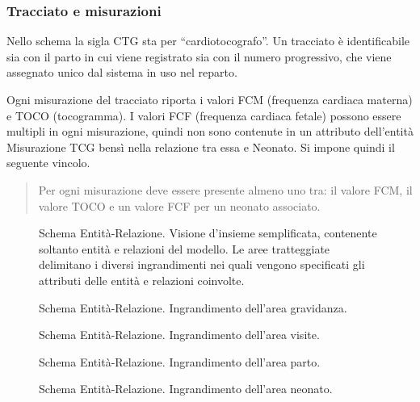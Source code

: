 \subsubsection{Tracciato e misurazioni}

Nello schema la sigla CTG sta per \enquote{cardiotocografo}.
Un tracciato è identificabile sia con il parto in cui viene registrato sia con il numero progressivo, che viene assegnato unico dal sistema in uso nel reparto.

Ogni misurazione del tracciato riporta i valori FCM (frequenza cardiaca materna) e TOCO (tocogramma).
I valori FCF (frequenza cardiaca fetale) possono essere multipli in ogni misurazione, quindi non sono contenute in un attributo dell'entità Misurazione TCG bensì nella relazione tra essa e Neonato.
Si impone quindi il seguente vincolo.
\begin{quote}
Per ogni misurazione deve essere presente almeno uno tra: il valore FCM, il valore TOCO e un valore FCF per un neonato associato.
\end{quote}

\begin{figure}
    \centering
    
    \caption{Schema Entità-Relazione. Visione d'insieme semplificata, contenente soltanto entità e relazioni del modello. Le aree tratteggiate delimitano i diversi ingrandimenti nei quali vengono specificati gli attributi delle entità e relazioni coinvolte.}
    \label{completeerdiagram}
\end{figure}

\begin{figure}
    \centering
    
    \caption{Schema Entità-Relazione. Ingrandimento dell'area gravidanza.}
    \label{pregnancyerdiagram}
\end{figure}

\begin{figure}
    \centering
    
    \caption{Schema Entità-Relazione. Ingrandimento dell'area visite.}
    \label{visitserdiagram}
\end{figure}

\begin{figure}
    \centering
    
    \caption{Schema Entità-Relazione. Ingrandimento dell'area parto.}
    \label{deliveryerdiagram}
\end{figure}

\begin{figure}
    \centering
    
    \caption{Schema Entità-Relazione. Ingrandimento dell'area neonato.}
    \label{newbornerdiagram}
\end{figure}
